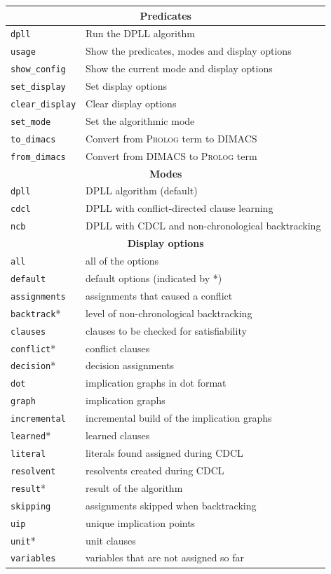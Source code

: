 \documentclass[11pt]{article}
\newcommand*{\p}[1]{\textup{\texttt{#1}}}
\newcommand*{\pl}{\textsc{Prolog}}
\begin{document}
\begin{center}
\begin{tabular}{|l|l|}
\hline
\multicolumn{2}{|c|}{\textbf{\large Predicates}}\\
\hline
\p{dpll}&Run the DPLL algorithm\\
\p{usage}&Show the predicates, modes and display options \\
\p{show\_config}&Show the current mode and display options\\
\p{set\_display}&Set display options\\
\p{clear\_display}&Clear display options\\
\p{set\_mode}&Set the algorithmic mode\\
\p{to\_dimacs}&Convert from \pl{} term to DIMACS\\
\p{from\_dimacs}&Convert from DIMACS to \pl{} term\\
\hline\hline
\multicolumn{2}{|c|}{\textbf{\large Modes}}\\
\hline
\p{dpll} & DPLL algorithm (default)\\
\p{cdcl} & DPLL with conflict-directed clause learning\\
\p{ncb} &  DPLL with CDCL and non-chronological backtracking\\
\hline\hline
\multicolumn{2}{|c|}{\textbf{\large Display options}}\\
\hline
\p{all}       &  all of the options\\
\p{default}   &  default options (indicated by *)\\
\hline
\p{assignments}& assignments that caused a conflict         \\
\p{backtrack}*&  level of non-chronological backtracking    \\
\p{clauses}   &  clauses to be checked for satisfiability   \\
\p{conflict}* &  conflict clauses                           \\
\p{decision}* &  decision assignments                       \\
\p{dot}       &  implication graphs in dot format           \\
\p{graph}     &  implication graphs                         \\
\p{incremental}& incremental build of the implication graphs\\
\p{learned}*  &  learned clauses                             \\
\p{literal}   &  literals found assigned during CDCL        \\
\p{resolvent} &  resolvents created during CDCL             \\
\p{result}*   &  result of the algorithm                    \\
\p{skipping}  &  assignments skipped when backtracking      \\
\p{uip}       &  unique implication points                   \\
\p{unit}*     &  unit clauses                               \\
\p{variables} &  variables that are not assigned so far     \\
\hline
\end{tabular}
\end{center}
\end{document}
